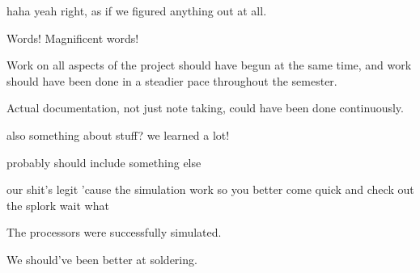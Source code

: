 haha yeah right, as if we figured anything out at all.



Words! Magnificent words!



Work on all aspects of the project should have begun at the same time, and work should have been done in a steadier pace throughout the semester.

Actual documentation, not just note taking, could have been done continuously.


also something about stuff?
we learned a lot!

probably should include something else

our shit's legit
'cause the simulation work
so you better come quick
and check out the splork
wait
what

The processors were successfully simulated.

We should've been better at soldering.
